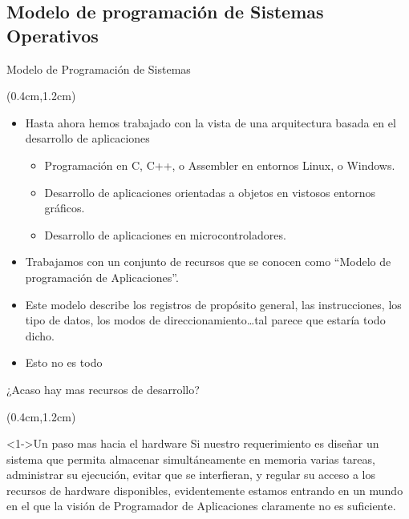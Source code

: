 \subsection{Modelo de programación de Sistemas Operativos}

\begin{frame}{Modelo de Programación de Sistemas}
 \begin{textblock*}{\textwidth}(0.4cm,1.2cm)
  \begin{itemize}[<+(1)->] \justifying \parskip 0.3cm
   \item Hasta ahora hemos trabajado con la vista de una arquitectura basada en el desarrollo de aplicaciones
   \begin{itemize} \justifying \parskip 0.3cm
    \item [\checkmark] Programación en C, C++, o Assembler en entornos Linux, o Windows.
    \item [\checkmark] Desarrollo de aplicaciones orientadas a objetos en vistosos entornos gráficos.
    \item [\checkmark] Desarrollo de aplicaciones en microcontroladores.
   \end{itemize}
   \item Trabajamos con un conjunto de recursos que se conocen como \textquotedblleft Modelo de programación de Aplicaciones\textquotedblright.
   \item Este modelo describe los registros de propósito general, las instrucciones, los tipo de datos, los modos de direccionamiento\dots tal parece que estaría todo dicho.
   \item Esto no es todo
  \end{itemize}
 \end{textblock*}
\end{frame}

\begin{frame}{¿Acaso hay mas recursos de desarrollo?}
 \begin{textblock*}{\textwidth}(0.4cm,1.2cm)
  \begin{block}<1->{Un paso mas hacia el hardware}
 Si nuestro requerimiento es diseñar un sistema que permita almacenar simultáneamente en memoria varias tareas, administrar su ejecución, evitar que se interfieran, y regular su acceso a los recursos de hardware disponibles, evidentemente estamos entrando en un mundo en el que la visión de Programador de Aplicaciones claramente no es suficiente.
  \end{block}
 \end{textblock*}
\end{frame}


